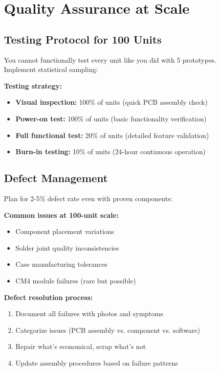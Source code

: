 \section{Quality Assurance at Scale}

\subsection{Testing Protocol for 100 Units}

You cannot functionally test every unit like you did with 5 prototypes. Implement statistical sampling:

\textbf{Testing strategy:}
\begin{itemize}
\item \textbf{Visual inspection:} 100\% of units (quick PCB assembly check)
\item \textbf{Power-on test:} 100\% of units (basic functionality verification)
\item \textbf{Full functional test:} 20\% of units (detailed feature validation)
\item \textbf{Burn-in testing:} 10\% of units (24-hour continuous operation)
\end{itemize}

\subsection{Defect Management}

Plan for 2-5\% defect rate even with proven components:

\textbf{Common issues at 100-unit scale:}
\begin{itemize}
\item Component placement variations
\item Solder joint quality inconsistencies
\item Case manufacturing tolerances
\item CM4 module failures (rare but possible)
\end{itemize}

\textbf{Defect resolution process:}
\begin{enumerate}
\item Document all failures with photos and symptoms
\item Categorize issues (PCB assembly vs. component vs. software)
\item Repair what's economical, scrap what's not
\item Update assembly procedures based on failure patterns
\end{enumerate}

